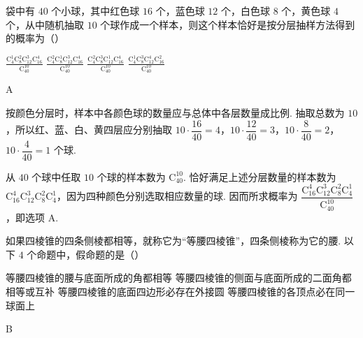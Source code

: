 \begin{problem}
袋中有 \(40\) 个小球，其中红色球 \(16\) 个，蓝色球 \(12\) 个，白色球 \(8\) 个，黄色球 \(4\) 个，从中随机抽取 \(10\) 个球作成一个样本，则这个样本恰好是按分层抽样方法得到的概率为（\quad）

\choices
    {\(\frac{\mathrm{C}_4^1\mathrm{C}_8^2\mathrm{C}_{12}^3\mathrm{C}_{16}^4}{\mathrm{C}_{40}^{10}}\)}
    {\(\frac{\mathrm{C}_4^2\mathrm{C}_8^1\mathrm{C}_{12}^3\mathrm{C}_{16}^4}{\mathrm{C}_{40}^{10}}\)}
    {\(\frac{\mathrm{C}_4^2\mathrm{C}_8^3\mathrm{C}_{12}^1\mathrm{C}_{16}^4}{\mathrm{C}_{40}^{10}}\)}
    {\(\frac{\mathrm{C}_4^1\mathrm{C}_8^3\mathrm{C}_{12}^4\mathrm{C}_{16}^2}{\mathrm{C}_{40}^{10}}\)}
\end{problem}

\begin{answer}
A
\end{answer}

\begin{solution}
按颜色分层时，样本中各颜色球的数量应与总体中各层数量成比例. 抽取总数为 \(10\)，所以红、蓝、白、黄四层应分别抽取 \(10\cdot\dfrac{16}{40}=4\)，\(10\cdot\dfrac{12}{40}=3\)，\(10\cdot\dfrac{8}{40}=2\)，\(10\cdot\dfrac4{40}=1\) 个球.

从 \(40\) 个球中任取 \(10\) 个球的样本数为 \(\mathrm C_{40}^{10}\). 恰好满足上述分层数量的样本数为 \(\mathrm C_{16}^{4}\mathrm C_{12}^{3}\mathrm C_{8}^{2}\mathrm C_{4}^{1}\)，因为四种颜色分别选取相应数量的球. 因而所求概率为 \(\dfrac{\mathrm C_{16}^{4}\mathrm C_{12}^{3}\mathrm C_{8}^{2}\mathrm C_{4}^{1}}{\mathrm C_{40}^{10}}\)，即选项 A.
\end{solution}

\begin{problem}
如果四棱锥的四条侧棱都相等，就称它为“等腰四棱锥”，四条侧棱称为它的腰. 以下 \(4\) 个命题中，假命题的是（\quad）

\choices
    {等腰四棱锥的腰与底面所成的角都相等}
    {等腰四棱锥的侧面与底面所成的二面角都相等或互补}
    {等腰四棱锥的底面四边形必存在外接圆}
    {等腰四棱锥的各顶点必在同一球面上}
\end{problem}

\begin{answer}
B
\end{answer}

